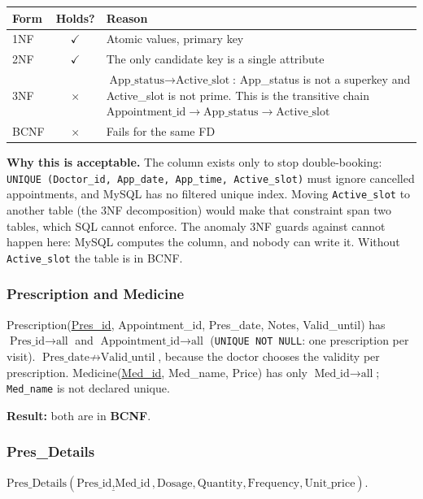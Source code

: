 \documentclass[11pt,a4paper]{article}
\newcommand{\code}[1]{\texttt{#1}}
\newcommand{\yes}{$\checkmark$}
\newcommand{\no}{$\times$}
\begin{document}
\begin{center}
\small
\begin{tabularx}{0.92\textwidth}{l c L}
\toprule
\textbf{Form} & \textbf{Holds?} & \textbf{Reason} \\
\midrule
1NF  & \yes & Atomic values, primary key \\
2NF  & \yes & The only candidate key is a single attribute \\
3NF  & \no  & $\text{App\_status} \rightarrow \text{Active\_slot}$: App\_status is not a superkey and Active\_slot is not prime. This is the transitive chain $\text{Appointment\_id} \rightarrow \text{App\_status} \rightarrow \text{Active\_slot}$ \\
BCNF & \no  & Fails for the same FD \\
\bottomrule
\end{tabularx}
\end{center}

\textbf{Why this is acceptable.} The column exists only to stop double-booking: \code{UNIQUE (Doctor\_id, App\_date, App\_time, Active\_slot)} must ignore cancelled appointments, and MySQL has no filtered unique index. Moving \code{Active\_slot} to another table (the 3NF decomposition) would make that constraint span two tables, which SQL cannot enforce. The anomaly 3NF guards against cannot happen here: MySQL computes the column, and nobody can write it. Without \code{Active\_slot} the table is in BCNF.

\subsubsection*{Prescription and Medicine}
Prescription(\underline{Pres\_id}, Appointment\_id, Pres\_date, Notes, Valid\_until) has $\text{Pres\_id} \rightarrow \text{all}$ and $\text{Appointment\_id} \rightarrow \text{all}$ (\code{UNIQUE NOT NULL}: one prescription per visit). $\text{Pres\_date} \nrightarrow \text{Valid\_until}$, because the doctor chooses the validity per prescription. Medicine(\underline{Med\_id}, Med\_name, Price) has only $\text{Med\_id} \rightarrow \text{all}$; \code{Med\_name} is not declared unique.

\textbf{Result:} both are in \textbf{BCNF}.

\subsubsection*{Pres\_Details}
$\text{Pres\_Details}(\underline{\text{Pres\_id}, \text{Med\_id}}, \text{Dosage}, \text{Quantity}, \text{Frequency}, \text{Unit\_price})$.
\end{document}
